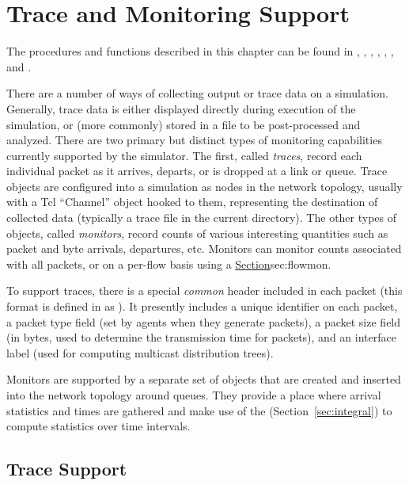 %
%
\chapter{Trace and Monitoring Support}
\label{chap:trace}

The procedures and functions described in this chapter can be found in
,
,
,
,
,
, and
.

There are a number of ways of collecting output or
trace data on a simulation.
Generally, trace data is either displayed directly during execution
of the simulation, or (more commonly) stored in a file to be
post-processed and analyzed.
There are two primary but distinct types of monitoring capabilities
currently supported by the simulator.
The first, called {\em traces}, record each individual packet
as it arrives, departs, or is dropped at a link or queue.
Trace objects are configured into a simulation as nodes in the
network topology, usually with a Tcl ``Channel'' object
hooked to them, representing the destination of collected data
(typically a trace file in the current directory).
The other types of objects, called {\em monitors}, record counts
of various interesting quantities such as packet and byte arrivals,
departures, etc.
Monitors can monitor counts associated with all packets,
or on a per-flow basis using a 
\href{{\em flow monitor} below}{Section}{sec:flowmon}.

To support traces, there is a special {\em common} header
included in each packet (this format is defined in 
as ).
It presently includes a unique identifier on each packet, a
packet type field (set by agents when they generate packets),
a packet size field (in bytes, used to determine the transmission
time for packets), and an interface label (used for computing
multicast distribution trees).

Monitors are supported by a separate
set of objects that are created and inserted into the network topology
around queues.
They provide a place where
arrival statistics and times are gathered and make use of the
 (Section~\ref{sec:integral})
to compute statistics over time intervals.

\section{Trace Support}
\label{sec:otcltrace}


